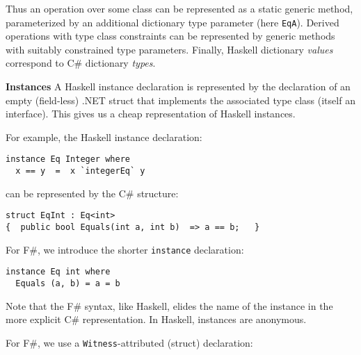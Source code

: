 \documentclass[9pt]{sig-alternate-05-2015}
\newif\ifclassic
\begin{document}
Thus an operation over some class can be represented as a static generic method, 
parameterized by an additional dictionary type parameter (here \lstinline{EqA}).
Derived operations with type class constraints can be represented by generic methods with suitably constrained type parameters.
Finally, Haskell dictionary \emph{values} correspond to  C\# dictionary \emph{types}.




{\bf Instances}
A Haskell instance declaration is represented by the declaration of an empty (field-less) .NET  struct that implements the associated type class (itself an interface).
This gives us a cheap representation of Haskell instances. 

For example, the Haskell instance declaration:


{\small
\begin{lstlisting}
instance Eq Integer where 
  x == y  =  x `integerEq` y
\end{lstlisting}
}
can be represented by the C\# structure:
\begin{lstlisting}
struct EqInt : Eq<int>  
{  public bool Equals(int a, int b)  => a == b;   }
\end{lstlisting}

\ifclassic
For F\#, we introduce the shorter \lstinline{instance} declaration:

\begin{lstlisting}
instance Eq int where 
  Equals (a, b) = a = b
\end{lstlisting}

Note that the F\# syntax, like Haskell, elides the name of the instance in the more explicit C\# representation.
In Haskell, instances are anonymous.

\else
For F\#, we use a \lstinline{Witness}-attributed (struct) declaration:
\end{document}
